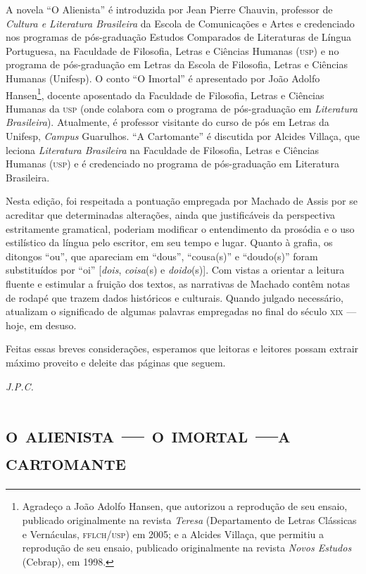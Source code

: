 A novela ``O Alienista'' é introduzida por Jean Pierre Chauvin,
professor de \emph{Cultura e Literatura Brasileira} da Escola de
Comunicações e Artes e credenciado nos programas de pós-graduação
Estudos Comparados de Literaturas de Língua Portuguesa, na Faculdade de
Filosofia, Letras e Ciências Humanas (\textsc{usp}) e no programa de
pós-graduação em Letras da Escola de Filosofia, Letras e Ciências
Humanas (Unifesp). O conto ``O Imortal'' é apresentado por João Adolfo
Hansen\footnote{Agradeço a João Adolfo Hansen, que autorizou a
  reprodução de seu ensaio, publicado originalmente na revista
  \emph{Teresa} (Departamento de Letras Clássicas e Vernáculas,
  \textsc{fflch}/\textsc{usp}) em 2005; e a Alcides Villaça, que permitiu a reprodução de
  seu ensaio, publicado originalmente na revista \emph{Novos Estudos}
  (Cebrap), em 1998.}, docente aposentado da Faculdade de Filosofia,
Letras e Ciências Humanas da \textsc{usp} (onde colabora com o programa de
pós-graduação em \emph{Literatura Brasileira}). Atualmente, é professor
visitante do curso de pós em Letras da Unifesp, \emph{Campus} Guarulhos.
``A Cartomante'' é discutida por Alcides Villaça, que leciona
\emph{Literatura Brasileira} na Faculdade de Filosofia, Letras e
Ciências Humanas (\textsc{usp}) e é credenciado no programa de pós-graduação em
Literatura Brasileira.

Nesta edição, foi respeitada a pontuação empregada por Machado de Assis
por se acreditar que determinadas alterações, ainda que justificáveis da
perspectiva estritamente gramatical, poderiam modificar o entendimento
da prosódia e o uso estilístico da língua pelo escritor, em seu tempo e
lugar. Quanto à grafia, os ditongos ``ou'', que apareciam em ``dous'',
``cousa(s)'' e ``doudo(s)'' foram substituídos por ``oi''
{[}\emph{dois}, \emph{coisa}(s) e \emph{doido}(s){]}. Com vistas a
orientar a leitura fluente e estimular a fruição dos textos, as
narrativas de Machado contêm notas de rodapé que trazem dados históricos
e culturais. Quando julgado necessário, atualizam o significado de
algumas palavras empregadas no final do século \textsc{xix} --- hoje, em desuso.

Feitas essas breves considerações, esperamos que leitoras e leitores
possam extrair máximo proveito e deleite das páginas que seguem.

\bigskip

\hfill{}\emph{J.P.C.}

\part[o alienista — o imortal — a cartomante]{\textsc{o alienista — o imortal —\break a cartomante}}

